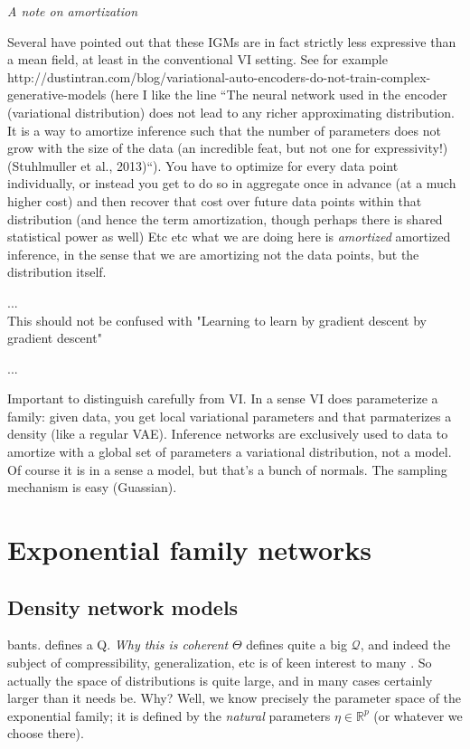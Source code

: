 \documentclass{article}
\begin{document}
 
 
 \emph{A note on amortization}
 
 Several have pointed out that these IGMs are in fact strictly less expressive than a mean field, at least in the conventional VI setting.  See for example http://dustintran.com/blog/variational-auto-encoders-do-not-train-complex-generative-models  (here I like the line ``The neural network used in the encoder (variational distribution) does not lead to any richer approximating distribution. It is a way to amortize inference such that the number of parameters does not grow with the size of the data (an incredible feat, but not one for expressivity!) (Stuhlmuller et al., 2013)``).
 You have to optimize for every data point individually, or instead you get to do so in aggregate once in advance (at a much higher cost) and then recover that cost over future data points within that distribution (and hence the term amortization, though perhaps there is shared statistical power as well)
 Etc etc what we are doing here is \emph{amortized} amortized inference, in the sense that we are amortizing not the data points, but the distribution itself.

... \\
This should not be confused with "Learning to learn by gradient descent by gradient descent" \cite{andrychowicz2016learning} 

...

Important to distinguish carefully from VI.  In a sense VI does parameterize a family: given data, you get local variational parameters and that parmaterizes a density (like a regular VAE).  Inference networks are exclusively used to data to amortize with a global set of parameters a variational distribution, not a model.  Of course it is in a sense a model, but that's a bunch of normals.  The sampling mechanism is easy (Guassian).  


  
 \section{Exponential family networks}
 
 \subsection{Density network models}

bants.  defines a Q.
 \emph{Why this is coherent}
 $\Theta$ defines quite a big $\mathcal{Q}$, and indeed the subject of compressibility, generalization, etc is of keen interest to many \cite{zhou2018compressability}.  So actually the space of distributions is quite large, and in many cases certainly larger than it needs be.  Why?  Well, we know precisely the parameter space of the exponential family; it is defined by the \emph{natural} parameters $\eta \in \mathbb{R}^p$ (or whatever we choose there).
\end{document}
